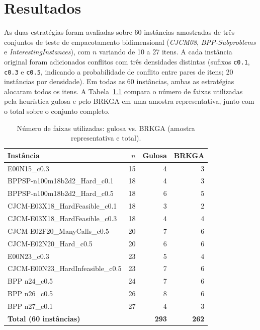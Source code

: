 \documentclass{report}
\begin{document}
\chapter{Resultados}
\label{sec:resultados}

As duas estratégias foram avaliadas sobre 60 instâncias amostradas de três
conjuntos de teste de empacotamento bidimensional (\textit{CJCM08},
\textit{BPP-Subproblems} e \textit{InterestingInstances}), com $n$ variando de
10 a 27 itens. A cada instância original foram adicionados conflitos com três
densidades distintas (sufixos \texttt{c0.1}, \texttt{c0.3} e \texttt{c0.5},
indicando a probabilidade de conflito entre pares de itens; 20 instâncias por
densidade). Em todas as 60 instâncias, ambas as estratégias alocaram todos os
itens. A Tabela~\ref{tab:resultados} compara o número de faixas utilizadas pela
heurística gulosa e pelo BRKGA em uma amostra representativa, junto com o total
sobre o conjunto completo.

\begin{table}[h]
\centering
\caption{Número de faixas utilizadas: gulosa vs. BRKGA (amostra representativa e total).}
\label{tab:resultados}
\begin{tabular}{lrrr}
\toprule
Instância & $n$ & Gulosa & BRKGA \\
\midrule
E00N15\_c0.3                       & 15 & 4 & 3 \\
BPPSP-n100m18b2d2\_Hard\_c0.1      & 18 & 4 & 3 \\
BPPSP-n100m18b2d2\_Hard\_c0.5      & 18 & 6 & 5 \\
CJCM-E03X18\_HardFeasible\_c0.1    & 18 & 3 & 2 \\
CJCM-E03X18\_HardFeasible\_c0.3    & 18 & 4 & 4 \\
CJCM-E02F20\_ManyCalls\_c0.5       & 20 & 7 & 6 \\
CJCM-E02N20\_Hard\_c0.5            & 20 & 6 & 6 \\
E00N23\_c0.3                       & 23 & 5 & 4 \\
CJCM-E00N23\_HardInfeasible\_c0.5  & 23 & 7 & 6 \\
BPP n24\_c0.5                      & 24 & 7 & 6 \\
BPP n26\_c0.5                      & 26 & 8 & 6 \\
BPP n27\_c0.1                      & 27 & 4 & 3 \\
\midrule
\textbf{Total (60 instâncias)}     &    & \textbf{293} & \textbf{262} \\
\bottomrule
\end{tabular}
\end{table}
\end{document}
